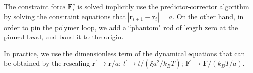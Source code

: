 \documentclass[aps,showpacs,twocolumn,floatfix,prx,superscriptaddress]{revtex4-1}
\begin{document}
The constraint force $\mathbf{F}_i^c$ is solved implicitly use the predictor-corrector algorithm by solving the constraint equations that $|\mathbf{r}_{i+1}-\mathbf{r}_i| = a$. On the other hand, in order to pin the polymer loop, we add a ``phantom" rod of length zero at the pinned bead, and bond it to the origin.

In practice, we use the dimensionless term of the dynamical equations that can be obtained by the rescaling $\mathbf{r}^{\prime}\to \mathbf{r}/a$; $t^{\prime}\to t/(\xi a^2/k_BT)$; $\mathbf{F}^{\prime}\to\mathbf{F}/(k_BT/a)$.






% 
\end{document}
